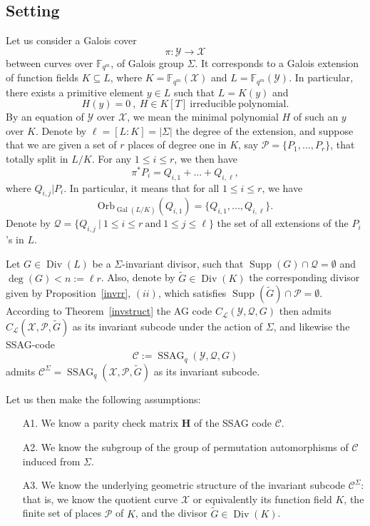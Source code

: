 \documentclass[10pt]{article}
\theoremstyle{definition}
\theoremstyle{definition}
\theoremstyle{definition}
\newcommand{\C}{\mathcal{C}}
\newcommand{\Fqm}{\mathbb{F}_{q^m}}
\newcommand{\su}{\subseteq}
\newcommand{\X}{\mathcal{X}}
\newcommand{\Y}{\mathcal{Y}}
\newcommand{\PR}{\mathcal{P}}
\newcommand{\QR}{\mathcal{Q}}
\newcommand{\Div}{\operatorname{Div}}
\newcommand{\Supp}{\operatorname{Supp}}
\newcommand{\Gal}{\operatorname{Gal}}
\newcommand{\ssag}{\operatorname{SSAG}}
\newcommand{\calL}{\mathcal{L}}
\begin{document}
\subsection{Setting}

Let us consider a Galois cover 
\[\pi : \Y \longrightarrow \X\]
between curves over $\Fqm$, of Galois group $\Sigma$. It corresponds to a Galois extension of function fields $K \su L$,
where $K=\Fqm(\X)$ and $L=\Fqm(\Y)$. In particular, there exists a primitive element $y \in L$ such that $L=K(y)$ and
\[ H(y)=0 \ , \ H \in K[T] \ \mathrm{irreducible \ polynomial.}\]
By an equation of $\Y$ over $\X$, we mean the minimal polynomial $H$ of such an $y$ over $K$.
Denote by $\ell=[L:K]=|\Sigma|$ the degree of the extension, and suppose that we are given a set of $r$ places of degree one in $K$, say $\PR = \{P_1,...,P_r\}$, that totally split in $L/K$. For any $1 \leq i \leq r$, we then have
\[\pi^*P_i = Q_{i,1} + ... + Q_{i,\ell},\]
where $Q_{i,j}|P_i$. In particular, it means that for all $1\leq i\leq r$, we have 
\[\mathrm{Orb}_{\Gal(L/K)}(Q_{i,1})=\{Q_{i,1}, ..., Q_{i,\ell}\}.\]
Denote by $\QR = \{Q_{i,j} \ | \ 1 \leq i \leq r \ \mathrm{and} \ 1 \leq j \leq \ell\}$ the set of all extensions of the $P_i$'s in $L$.

Let $G \in \Div(L)$ be a $\Sigma$-invariant divisor, such that $\Supp(G) \cap \QR = \emptyset$ and $\deg(G)<n:=\ell r$. Also, denote by $\tilde{G} \in \Div(K)$ the corresponding divisor given by Proposition~\ref{invrr}, $(ii)$, which satisfies $\Supp(\tilde{G}) \cap \PR = \emptyset$. 
According to Theorem~\ref{invstruct} the AG code $C_{\calL}(\Y,\QR,G)$ then admits $C_{\calL}(\X,\PR,\tilde{G})$ as its invariant subcode under the action of $\Sigma$,
and likewise the SSAG-code
\[\mathcal{C} := \ssag_q(\Y,\QR,G)\]
admits $\C^{\Sigma}=\ssag_q(\X,\PR,\tilde{G})$ as its invariant subcode.

Let us then make the following assumptions:
\begin{itemize}
\item[A1.] We know a parity check matrix $\mathbf{H}$ of the SSAG code $\mathcal{C}$.
\item[A2.] We know the subgroup of the group of permutation automorphisms of $\mathcal{C}$ induced from $\Sigma$.
\item[A3.] We know the underlying geometric structure of the invariant subcode $\C^{\Sigma}$: that is, we know the quotient curve $\X$ or equivalently its function field $K$, the finite set of places $\PR$ of $K$, and the divisor $\tilde{G} \in \Div(K)$.
\end{itemize}
\end{document}
